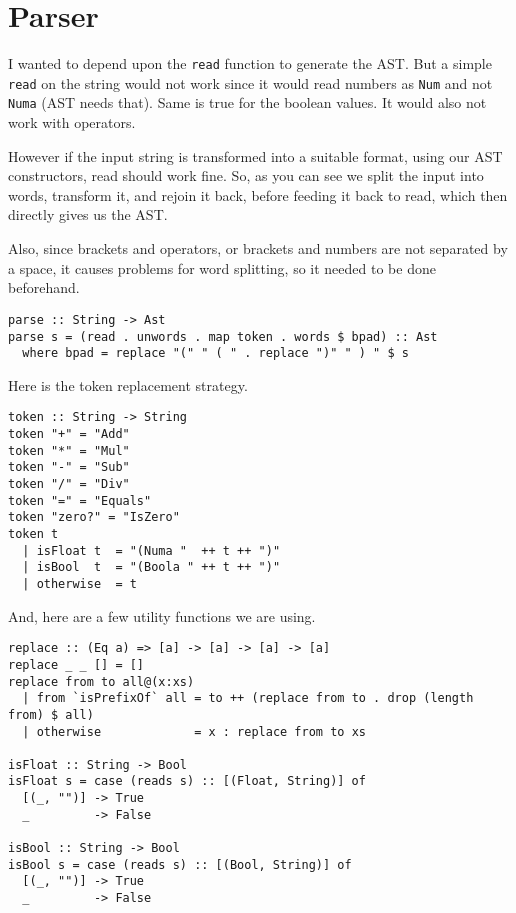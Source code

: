 \documentclass[11pt]{article}
\begin{document}
\section{Parser}
\label{sec:org1edeaab}

I wanted to depend upon the \texttt{read} function to generate the AST. But a simple
\texttt{read} on the string would not work since it would read numbers as \texttt{Num} and
not \texttt{Numa} (AST needs that). Same is true for the boolean values. It would
also not work with operators.

However if the input string is transformed into a suitable format, using our
AST constructors, read should work fine. So, as you can see we split the
input into words, transform it, and rejoin it back, before feeding it
back to read, which then directly gives us the AST.

Also, since brackets and operators, or brackets and numbers are not separated
by a space, it causes problems for word splitting, so it needed to be done
beforehand.

\begin{verbatim}
parse :: String -> Ast
parse s = (read . unwords . map token . words $ bpad) :: Ast
  where bpad = replace "(" " ( " . replace ")" " ) " $ s
\end{verbatim}

Here is the token replacement strategy.

\begin{verbatim}
token :: String -> String
token "+" = "Add"
token "*" = "Mul"
token "-" = "Sub"
token "/" = "Div"
token "=" = "Equals"
token "zero?" = "IsZero"
token t
  | isFloat t  = "(Numa "  ++ t ++ ")"
  | isBool  t  = "(Boola " ++ t ++ ")"
  | otherwise  = t
\end{verbatim}

And, here are a few utility functions we are using.

\begin{verbatim}
replace :: (Eq a) => [a] -> [a] -> [a] -> [a]
replace _ _ [] = []
replace from to all@(x:xs)
  | from `isPrefixOf` all = to ++ (replace from to . drop (length from) $ all)
  | otherwise             = x : replace from to xs

isFloat :: String -> Bool
isFloat s = case (reads s) :: [(Float, String)] of
  [(_, "")] -> True
  _         -> False

isBool :: String -> Bool
isBool s = case (reads s) :: [(Bool, String)] of
  [(_, "")] -> True
  _         -> False
\end{verbatim}
\end{document}

